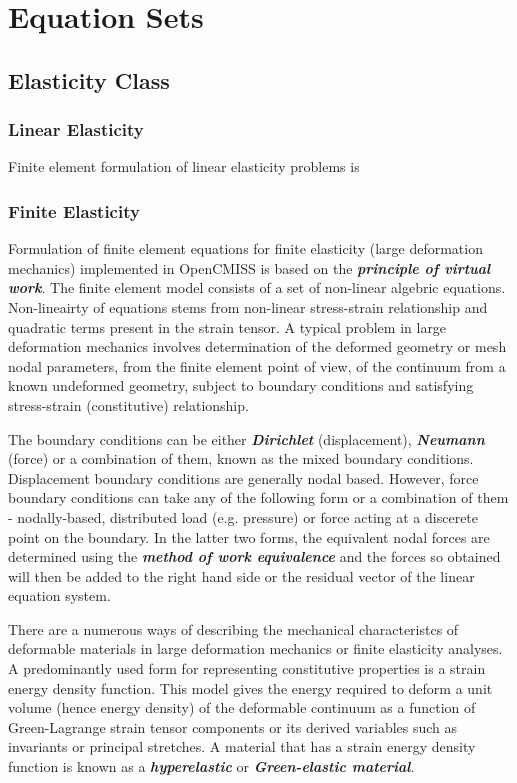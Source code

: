 \clearemptydoublepage
\chapter{Equation Sets}
\label{cha:equationsets}

\section{Elasticity Class}

\subsection{Linear Elasticity}

Finite element formulation of linear elasticity problems is

\subsection{Finite Elasticity}

Formulation of finite element equations for finite elasticity (large deformation mechanics) implemented in OpenCMISS is based on the 
\textit{\textbf{principle of virtual work}}. The finite element model consists of a set of non-linear algebric equations. Non-lineairty of 
equations stems from non-linear stress-strain relationship and quadratic terms present in the strain tensor. A typical problem in large deformation 
mechanics involves determination of the deformed geometry or mesh nodal parameters, from the finite element point of view, of the continuum 
from a known undeformed geometry, subject to boundary conditions and satisfying stress-strain (constitutive) relationship. 
  
The boundary conditions can be either \textit{\textbf{Dirichlet}} (displacement), \textit{\textbf{Neumann}} (force) or a combination of them, known 
as the mixed boundary conditions. Displacement boundary conditions are generally nodal based. However, force boundary conditions can take 
any of the following form or a combination of them - nodally-based, distributed load (e.g. pressure) or force acting at a discerete point 
on the boundary. In the latter two forms, the equivalent nodal forces are determined using the \textit{\textbf{method of work equivalence}} 
\cite{hutton:2004} and the forces so obtained will then be added to the right hand side or the residual vector of the linear equation system.  

There are a numerous ways of describing the mechanical characteristcs of deformable materials in large deformation mechanics or finite elasticity
analyses. A predominantly used form for representing constitutive properties is a strain energy density function. This model gives the energy 
required to deform a unit volume (hence energy density) of the deformable continuum as a function of Green-Lagrange strain tensor components or its 
derived variables such as invariants or principal stretches. A material that has a strain energy density function is known as a 
\textit{\textbf{hyperelastic}} or \textit{\textbf{Green-elastic material}}. 

